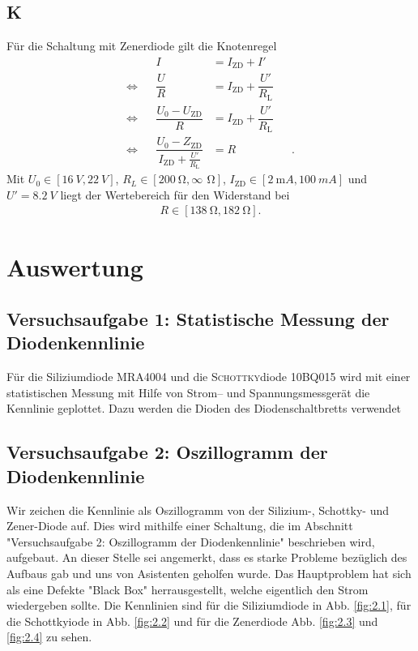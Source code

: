\documentclass[a4paper,10pt]{article}
\numberwithin{equation}{section}
\begin{document}
\subsection{K}
Für die Schaltung mit Zenerdiode gilt die Knotenregel
\begin{align}
	                &  & I                                                            & =I_{\text{ZD}}+I'                        &  & \\
	\Leftrightarrow &  & \dfrac{U}{R}                                                 & =I_{\text{ZD}}+\dfrac{U'}{R_{\text{L}} } &  & \\
	\Leftrightarrow &  & \dfrac{U_0-U_\text{ZD}}{R}                                   & =I_\text{ZD}+\dfrac{U'}{R_\text{L}}      &  & \\
	\Leftrightarrow &  & \dfrac{U_0-Z_\text{ZD}}{I_\text{ZD}+\tfrac{U'}{R_\text{L} }} & =R                                       &  &
	.\end{align}
Mit $U_0 \in \left[\SI{16}{V},\SI{22}{V}\right]$, $R_L \in \left[\SI{200}{\ohm},\infty\,\SI{}{\ohm}\right]$, $I_\text{ZD} \in \left[\SI{2}{\milli A},\SI{100}{mA}\right]$  und $U'=\SI{8.2}{V}$ liegt der Wertebereich für den Widerstand bei
\begin{align}
	R \in \left[\SI{138}{\ohm},\SI{182}{\ohm}\right]
	.\end{align}

\clearpage
\section{Auswertung}
\subsection{Versuchsaufgabe 1: Statistische Messung der Diodenkennlinie}
Für die Siliziumdiode MRA4004 und die \textsc{Schottky}diode 10BQ015 wird mit einer statistischen Messung mit Hilfe von Strom-- und Spannungsmessgerät die Kennlinie geplottet.
Dazu werden die Dioden des Diodenschaltbretts verwendet

\subsection{Versuchsaufgabe 2: Oszillogramm der Diodenkennlinie}
Wir zeichen die Kennlinie als Oszillogramm von der Silizium-, Schottky- und Zener-Diode auf. Dies wird mithilfe einer Schaltung, die im Abschnitt "Versuchsaufgabe 2: Oszillogramm der Diodenkennlinie" \cite{Praktikumsanleitung} beschrieben wird, aufgebaut. An dieser Stelle sei angemerkt, dass es starke Probleme bezüglich des Aufbaus gab und uns von Asistenten geholfen wurde. Das Hauptproblem hat sich als eine Defekte "Black Box" \cite{Praktikumsanleitung} herrausgestellt, welche eigentlich den Strom wiedergeben sollte. Die Kennlinien sind für die Siliziumdiode in Abb. \ref{fig:2.1}, für die Schottkyiode in Abb. \ref{fig:2.2} und für die Zenerdiode Abb. \ref{fig:2.3} und \ref{fig:2.4} zu sehen.
\end{document}

